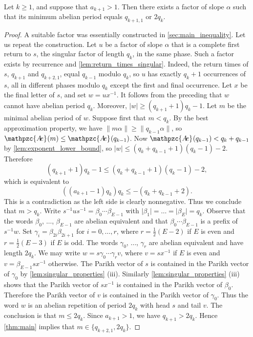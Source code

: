\documentclass[a4paper,fleqn]{article}
\providecommand{\abs}[1]{\lvert#1\rvert}
\providecommand{\norm}[1]{\lVert#1\rVert}
\newcommand{\abexp}[2][]{\mathpzc{A\mkern-3mu e}_{#1}(#2)}
\begin{document}
  \begin{proposition}\label{prp:fibonacci_counter_example}
    Let $k \geq 1$, and suppose that $a_{k+1} > 1$. Then there exists a factor of slope $\alpha$ such that its minimum
    abelian period equals $q_{k+1,1}$ or $2q_k$.
  \end{proposition}
  \begin{proof}
    A suitable factor was essentially constructed in \autoref{sec:main_inequality}. Let us repeat the construction.
    Let $u$ be a factor of slope $\alpha$ that is a complete first return to $s$, the singular factor of length $q_k$,
    in the same phase. Such a factor exists by recurrence and \autoref{lem:return_times_singular}. Indeed, the return
    times of $s$, $q_{k+1}$ and $q_{k+2,1}$, equal $q_{k-1}$ modulo $q_k$, so $u$ has exactly $q_k + 1$ occurrences of
    $s$, all in different phases modulo $q_k$ except the first and final occurrence. Let $x$ be the final letter of
    $s$, and set $w = ux^{-1}$. It follows from the preceding that $w$ cannot have abelian period $q_k$. Moreover,
    $\abs{w} \geq (q_{k+1} + 1)q_k - 1$. Let $m$ be the minimal abelian period of $w$. Suppose first that $m < q_k$. By
    the best approximation property, we have $\norm{m\alpha} \geq \norm{q_{k-1}\alpha}$, so
    $\abexp{m} \leq \abexp{q_{k-1}}$. Now $\abexp{q_{k-1}} < q_k + q_{k-1}$ by \autoref{lem:exponent_lower_bound}, so
    $\abs{w} \leq (q_k + q_{k-1} + 1)(q_k - 1) - 2$. Therefore
    \begin{equation*}
      (q_{k+1} + 1)q_k - 1 \leq (q_k + q_{k-1} + 1)(q_k - 1) - 2,
    \end{equation*}
    which is equivalent to
    \begin{equation*}
      ((a_{k+1} - 1)q_k)q_k \leq -(q_k + q_{k-1} + 2).
    \end{equation*}
    This is a contradiction as the left side is clearly nonnegative. Thus we conclude that $m > q_k$. Write
    $s^{-1}us^{-1} = \beta_0 \cdots \beta_{E-1}$ with $\abs{\beta_1} = \ldots = \abs{\beta_E} = q_k$. Observe that the
    words $\beta_0$, $\ldots$, $\beta_{E-1}$ are abelian equivalent and that $\beta_0 \cdots \beta_{E-1}$ is a prefix
    of $s^{-1}w$. Set $\gamma_i = \beta_{2i}\beta_{2i+1}$ for $i = 0, \ldots, r$, where $r = \tfrac12(E - 2)$ if $E$ is
    even and $r = \tfrac12(E - 3)$ if $E$ is odd. The words $\gamma_0$, $\ldots$, $\gamma_r$ are abelian equivalent and
    have length $2q_k$. We may write $w = s\gamma_0 \cdots \gamma_r v$, where $v = sx^{-1}$ if $E$ is even and
    $v = \beta_{E-1}sx^{-1}$ otherwise. The Parikh vector of $s$ is contained in the Parikh vector of $\gamma_0$ by
    \autoref{lem:singular_properties} (iii). Similarly \autoref{lem:singular_properties} (iii) shows that the Parikh
    vector of $sx^{-1}$ is contained in the Parikh vector of $\beta_0$. Therefore the Parikh vector of $v$ is contained
    in the Parikh vector of $\gamma_0$. Thus the word $w$ is an abelian repetition of period $2q_k$ with head $s$ and
    tail $v$. The conclusion is that $m \leq 2q_k$. Since $a_{k+1} > 1$, we have $q_{k+1} > 2q_k$. Hence
    \autoref{thm:main} implies that $m \in \{q_{k+2,1}, 2q_k\}$.
  \end{proof}
\end{document}
